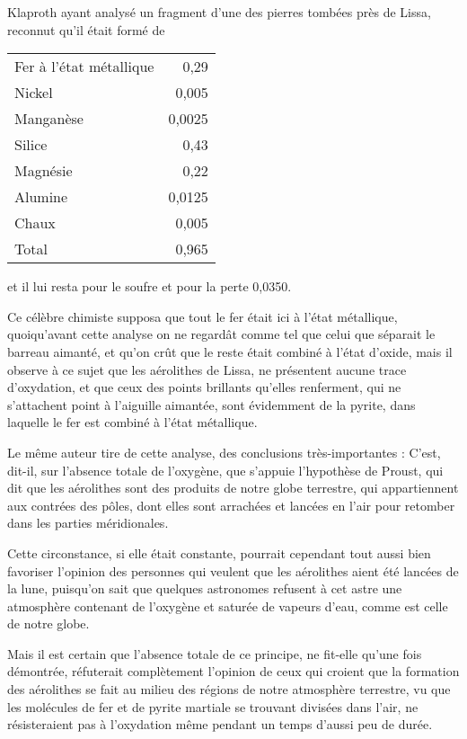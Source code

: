 \documentclass[a4paper, 12pt, oneside, french]{article}
\begin{document}
Klaproth ayant analysé un fragment d'une des pierres tombées près de Lissa, reconnut qu'il était formé de
\begin{table}[H]
    \centering
    \begin{tabular}{l r}
        Fer à l'état métallique & 0,29 \\
        Nickel & 0,005 \\
        Manganèse & 0,0025 \\
        Silice & 0,43 \\
        Magnésie & 0,22 \\
        Alumine & 0,0125 \\
        Chaux & 0,005 \\ \hline
        Total & 0,965 \\
    \end{tabular}
\end{table}
et il lui resta pour le soufre et pour la perte 0,0350.

Ce célèbre chimiste supposa que tout le fer était ici à l'état métallique, quoiqu'avant cette analyse on ne regardât comme tel que celui que séparait le barreau aimanté, et qu'on crût que le reste était combiné à l'état d'oxide, mais il observe à ce sujet que les aérolithes de Lissa, ne présentent aucune trace d'oxydation, et que ceux des points brillants qu'elles renferment, qui ne s'attachent point à l'aiguille aimantée, sont évidemment de la pyrite, dans laquelle le fer est combiné à l'état métallique.

Le même auteur tire de cette analyse, des conclusions très-importantes : \og C'est, dit-il, sur l'absence totale de l'oxygène, que s'appuie l'hypothèse de Proust, qui dit que les aérolithes sont des produits de notre globe terrestre, qui appartiennent aux contrées des pôles, dont elles sont arrachées et lancées en l'air pour retomber dans les parties méridionales. \fg

Cette circonstance, si elle était constante, pourrait cependant tout aussi bien favoriser l'opinion des personnes qui veulent que les aérolithes aient été lancées de la lune, puisqu'on sait que quelques astronomes refusent à cet astre une atmosphère contenant de l'oxygène et saturée de vapeurs d'eau, comme est celle de notre globe.

Mais il est certain que l'absence totale de ce principe, ne fit-elle qu'une fois démontrée, réfuterait complètement l'opinion de ceux qui croient que la formation des aérolithes se fait au milieu des régions de notre atmosphère terrestre, vu que les molécules de fer et de pyrite martiale se trouvant divisées dans l'air, ne résisteraient pas à l'oxydation même pendant un temps d'aussi peu de durée.
\end{document}
